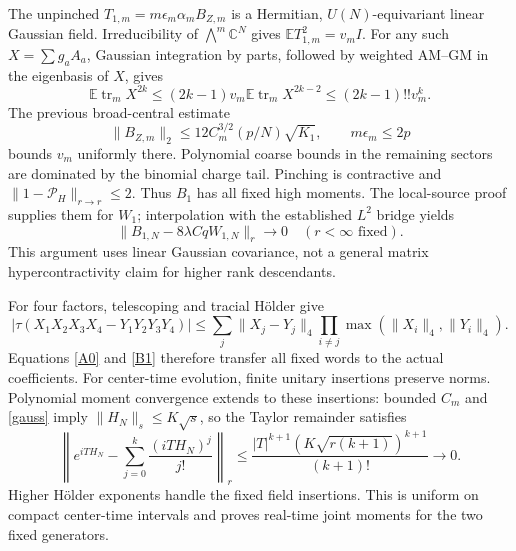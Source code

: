 \documentclass[11pt]{article}
\newcommand{\EE}{\mathbb E}
\newcommand{\tr}{\operatorname{tr}}
\newcommand{\PP}{\mathcal P_H}
\begin{document}
The unpinched $T_{1,m}=m\epsilon_m\alpha_mB_{Z,m}$ is a
Hermitian, $U(N)$-equivariant linear Gaussian field. Irreducibility of
$\bigwedge^m\mathbb C^N$ gives
$\EE T_{1,m}^2=v_mI$. For any such $X=\sum g_aA_a$, Gaussian
integration by parts, followed by weighted AM--GM in the eigenbasis
of $X$, gives
\begin{equation}
 \EE\tr_mX^{2k}\le(2k-1)v_m\EE\tr_mX^{2k-2}
 \le(2k-1)!!v_m^k.\label{gauss}
\end{equation}
The previous broad-central estimate
\begin{equation}
 \|B_{Z,m}\|_2\le 12C_m^{3/2}(p/N)\sqrt{K_1},\qquad
 m\epsilon_m\le2p
\end{equation}
bounds $v_m$ uniformly there. Polynomial coarse bounds in the
remaining sectors are dominated by the binomial charge tail.
Pinching is contractive and $\|1-\PP\|_{r\to r}\le2$. Thus $B_1$
has all fixed high moments. The local-source proof supplies them for
$W_1$; interpolation with the established $L^2$ bridge yields
\begin{equation}
 \boxed{\|B_{1,N}-8\lambda CqW_{1,N}\|_r\longrightarrow0
       \quad (r<\infty\text{ fixed}).}\label{B1}
\end{equation}
This argument uses linear Gaussian covariance, not a general matrix
hypercontractivity claim for higher rank descendants.

For four factors, telescoping and tracial H\"older give
\begin{equation}
 |\tau(X_1X_2X_3X_4-Y_1Y_2Y_3Y_4)|
 \le\sum_j\|X_j-Y_j\|_4
       \prod_{i\ne j}\max(\|X_i\|_4,\|Y_i\|_4).
\end{equation}
Equations \eqref{A0} and \eqref{B1} therefore transfer all fixed words
to the actual coefficients. For center-time evolution, finite unitary
insertions preserve norms. Polynomial moment convergence extends to
these insertions: bounded $C_m$ and \eqref{gauss} imply
$\|H_N\|_s\le K\sqrt s$, so the Taylor remainder satisfies
\begin{equation}
 \left\|e^{iTH_N}-\sum_{j=0}^{k}\frac{(iTH_N)^j}{j!}\right\|_r
 \le \frac{|T|^{k+1}(K\sqrt{r(k+1)})^{k+1}}{(k+1)!}\to0.
\end{equation}
Higher H\"older exponents handle the fixed field insertions. This is
uniform on compact center-time intervals and proves real-time joint
moments for the two fixed generators.

\newpage
\end{document}
